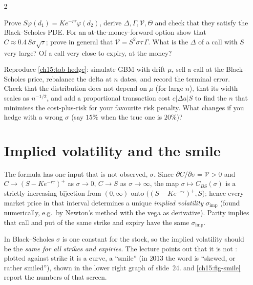 \begin{paracol}{2}
\begin{exercise}\label{ch15:ex-greeks}
Prove $S\varphi(d_1)=Ke^{-r\tau}\varphi(d_2)$, derive $\Delta,\Gamma,\mathcal V,\Theta$ and check that they satisfy the Black--Scholes PDE. For an at-the-money-forward option show that $C\approx0.4\,S\sigma\sqrt\tau$; prove in general that $\mathcal V=S^2\sigma\tau\,\Gamma$. What is the $\Delta$ of a call with $S$ very large? Of a call very close to expiry, at the money?
\end{exercise}

\begin{exercise}\label{ch15:ex-hedge}
Reproduce \cref{ch15:tab-hedge}: simulate GBM with drift $\mu$, sell a call at the Black--Scholes price, rebalance the delta at $n$ dates, and record the terminal error. Check that the distribution does not depend on $\mu$ (for large $n$),
that its width scales as $n^{-1/2}$, and add a proportional transaction cost $c|\Delta a|S$ to find the $n$ that minimises the cost-plus-risk for your favourite risk penalty. What changes if you hedge with a wrong $\sigma$ (say $15\%$ when the true one is $20\%$)?
\end{exercise}

\section{Implied volatility and the smile}\label{ch15:sec-smile}
The formula has one input that is not observed, $\sigma$. Since $\partial C/\partial\sigma=\mathcal V>0$ and $C\to(S-Ke^{-r\tau})^+$ as $\sigma\to0$, $C\to S$ as $\sigma\to\infty$, the map $\sigma\mapsto C_{BS}(\sigma)$ is a strictly increasing
bijection from $(0,\infty)$ onto $\bigl((S-Ke^{-r\tau})^+,S\bigr)$; hence every market price in that interval determines a unique \emph{implied volatility} $\sigma_{\mathrm{imp}}$ (found numerically, e.g.\ by Newton's method with the vega as derivative). Parity implies that call and put
of the same strike and expiry have the same $\sigma_{\mathrm{imp}}$.

In Black--Scholes $\sigma$ is one constant for the stock, so the implied volatility should be the \emph{same for all strikes and expiries}. The lecture points out that it is not
: plotted against strike it is a curve, a ``smile'' (in 2013 the word is ``skewed, or rather smiled''), shown in the lower right graph of slide~24.  and
\cref{ch15:fig-smile} report the numbers of that screen.


\end{paracol}

